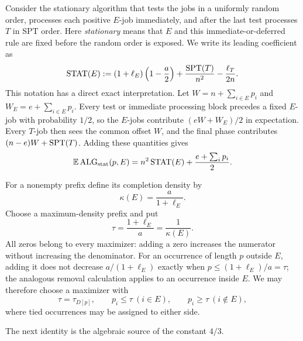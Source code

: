 Consider the stationary algorithm that tests the jobs in a uniformly random
order, processes each positive $E$-job immediately, and after the last test
processes $T$ in SPT order.  Here \emph{stationary} means that $E$ and this
immediate-or-deferred rule are fixed before the random order is exposed.
We write its leading coefficient as
\begin{equation}
 \operatorname{STAT}(E)
 \mathrel{:=}(1+\ell_E)\left(1-\frac a2\right)
   +\frac{\operatorname{SPT}(T)}{n^2}-\frac{\ell_T}{2n}.
 \label{eq:stationary-leading-coefficient}
\end{equation}
This notation has a direct exact interpretation.  Let
$W=n+\sum_{i\in E}p_i$ and $W_E=e+\sum_{i\in E}p_i$.  Every test or immediate
processing block precedes a fixed $E$-job with probability $1/2$, so the
$E$-jobs contribute $(eW+W_E)/2$ in expectation.  Every $T$-job then sees
the common offset $W$, and the final phase contributes
$(n-e)W+\operatorname{SPT}(T)$.  Adding these quantities gives
\begin{equation}
 \mathbb{E}\operatorname{ALG}_{\mathrm{stat}}(p,E)
 =n^2\operatorname{STAT}(E)+\frac{e+\sum_i p_i}{2}.
 \label{eq:stationary-prefix-cost}
\end{equation}

For a nonempty prefix define its completion density by
\begin{equation}
 \kappa(E)=\frac{a}{1+\ell_E}.
 \label{eq:rand-density}
\end{equation}
Choose a maximum-density prefix and put
\begin{equation}
 \tau=\frac{1+\ell_E}{a}=\frac1{\kappa(E)}.
 \label{eq:rand-tau}
\end{equation}
All zeros belong to every maximizer: adding a zero increases the numerator
without increasing the denominator.
For an occurrence of length $p$ outside $E$, adding it does not decrease
$a/(1+\ell_E)$ exactly when $p\le(1+\ell_E)/a=\tau$; the analogous removal
calculation applies to an occurrence inside $E$.  We may therefore choose a
maximizer with
\begin{equation}
 \tau=\tau_{D[p]},\qquad
 p_i\le\tau\ (i\in E),\qquad p_i\ge\tau\ (i\notin E),
 \label{eq:rand-density-threshold}
\end{equation}
where tied occurrences may be assigned to either side.

The next identity is the algebraic source of the constant $4/3$.

